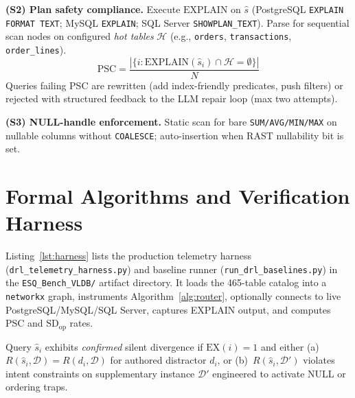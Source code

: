 \documentclass[twocolumn]{svjour3}
\begin{document}
\textbf{(S2) Plan safety compliance.}
Execute $\text{EXPLAIN}$ on $\hat{s}$ (PostgreSQL \texttt{EXPLAIN FORMAT TEXT}; MySQL \texttt{EXPLAIN}; SQL Server \texttt{SHOWPLAN\_TEXT}).
Parse for sequential scan nodes on configured \emph{hot tables} $\mathcal{H}$ (e.g., \texttt{orders}, \texttt{transactions}, \texttt{order\_lines}).
\begin{equation}
  \text{PSC} = \frac{|\{i : \text{EXPLAIN}(\hat{s}_i)\cap \mathcal{H} = \emptyset\}|}{N}
\end{equation}
Queries failing PSC are rewritten (add index-friendly predicates, push filters) or rejected with structured feedback to the LLM repair loop (max two attempts).

\textbf{(S3) NULL-handle enforcement.}
Static scan for bare \texttt{SUM/AVG/MIN/MAX} on nullable columns without \texttt{COALESCE}; auto-insertion when RAST nullability bit is set.

\section{Formal Algorithms and Verification Harness}
\label{sec:harness}

Listing~\ref{lst:harness} lists the production telemetry harness (\texttt{drl\_telemetry\_harness.py}) and baseline runner (\texttt{run\_drl\_baselines.py}) in the \texttt{ESQ\_Bench\_VLDB/} artifact directory.
It loads the 465-table catalog into a \texttt{networkx} graph, instruments Algorithm~\ref{alg:router}, optionally connects to live PostgreSQL/MySQL/SQL Server, captures EXPLAIN output, and computes PSC and $\text{SD}_{\text{op}}$ rates.



\begin{drdef}
\label{def:formal_sd}
Query $\hat{s}_i$ exhibits \emph{confirmed} silent divergence if $\text{EX}(i){=}1$ and either (a)~$R(\hat{s}_i,\mathcal{D})=R(d_i,\mathcal{D})$ for authored distractor $d_i$, or (b)~$R(\hat{s}_i,\mathcal{D}')$ violates intent constraints on supplementary instance $\mathcal{D}'$ engineered to activate NULL or ordering traps.
\end{drdef}
\end{document}
